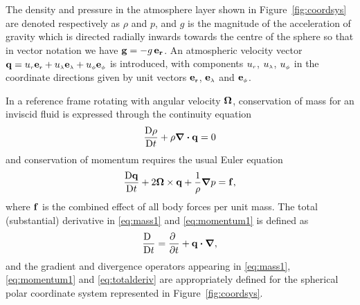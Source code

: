 The density and pressure in the atmosphere layer shown in Figure~\ref{fig:coordsys} are denoted respectively as $\rho$ and $p$, and $g$ is the magnitude of the acceleration of gravity which is directed radially inwards towards the centre of the sphere so that in vector notation we have $\mathbf{g}=-g\,\mathbf{e_r}$. An atmospheric velocity vector $\mathbf{q} = {u_{\scriptscriptstyle r}} \mathbf{e_{\scriptscriptstyle r}} + {u_{\scriptscriptstyle \lambda}} \mathbf{e_{\scriptscriptstyle \lambda}} + {u_{\scriptscriptstyle \phi}} \mathbf{e_{\scriptscriptstyle \phi}}$ is introduced, with components \index{$\ur$}$\ur$, \index{$\ulam$}$\ulam$, \index{$\uphi$}$\uphi$ in the coordinate directions given by unit vectors $\mathbf{e_{\scriptscriptstyle r}}$, $\mathbf{e_{\scriptscriptstyle \lambda}}$ and $\mathbf{e_{\scriptscriptstyle \phi}}$.

In a reference frame rotating with angular velocity $\mathbf{\Omega}$, conservation of mass for an inviscid fluid is expressed through the continuity equation
\begin{equation}
  \frac{\mathrm{D} \rho }{\mathrm{D} t} + \rho \boldsymbol{\nabla}\boldsymbol{\cdot}\mathbf{q} = 0
  \label{eq:mass1}
\end{equation}
and conservation of momentum requires the usual Euler equation
\begin{equation}
	\frac{\mathrm{D}\mathbf{q}}{\mathrm{D} t} + 2 \mathbf{\Omega} \times \mathbf{q} + \frac{1}{\rho} \boldsymbol{\nabla} p = \mathbf{f},
  \label{eq:momentum1}
\end{equation}
where $\mathbf{f}$ is the combined effect of all body forces per unit mass. The total (substantial) derivative in \eqref{eq:mass1} and \eqref{eq:momentum1} is defined as
\begin{equation}
  \frac{\mathrm{D} \ }{\mathrm{D} t} = \frac{\partial \ }{\partial t} + \mathbf{q} \boldsymbol{\cdot} \boldsymbol{\nabla},
  \label{eq:totalderiv}
\end{equation}
and the gradient and divergence operators appearing in \eqref{eq:mass1}, \eqref{eq:momentum1} and \eqref{eq:totalderiv} are appropriately defined for the spherical polar coordinate system represented in Figure~\ref{fig:coordsys}. 

